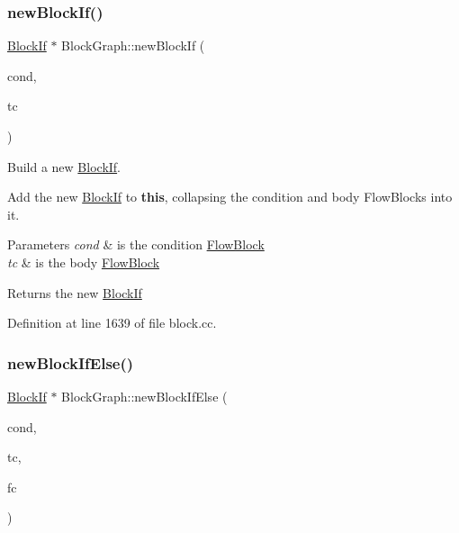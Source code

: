 \subsubsection{\texorpdfstring{newBlockIf()}{newBlockIf()}}
{\footnotesize\ttfamily \mbox{\hyperlink{class_block_if}{Block\+If}} $\ast$ Block\+Graph\+::new\+Block\+If (\begin{DoxyParamCaption}\item[{\mbox{\hyperlink{class_flow_block}{Flow\+Block}} $\ast$}]{cond,  }\item[{\mbox{\hyperlink{class_flow_block}{Flow\+Block}} $\ast$}]{tc }\end{DoxyParamCaption})}



Build a new \mbox{\hyperlink{class_block_if}{Block\+If}}. 

Add the new \mbox{\hyperlink{class_block_if}{Block\+If}} to {\bfseries{this}}, collapsing the condition and body Flow\+Blocks into it. 
\begin{DoxyParams}{Parameters}
{\em cond} & is the condition \mbox{\hyperlink{class_flow_block}{Flow\+Block}} \\
\hline
{\em tc} & is the body \mbox{\hyperlink{class_flow_block}{Flow\+Block}} \\
\hline
\end{DoxyParams}
\begin{DoxyReturn}{Returns}
the new \mbox{\hyperlink{class_block_if}{Block\+If}} 
\end{DoxyReturn}


Definition at line 1639 of file block.\+cc.

\mbox{\label{class_block_graph_acea0ea1a425020062f5d6e3b87a69fe0}} 
\subsubsection{\texorpdfstring{newBlockIfElse()}{newBlockIfElse()}}
{\footnotesize\ttfamily \mbox{\hyperlink{class_block_if}{Block\+If}} $\ast$ Block\+Graph\+::new\+Block\+If\+Else (\begin{DoxyParamCaption}\item[{\mbox{\hyperlink{class_flow_block}{Flow\+Block}} $\ast$}]{cond,  }\item[{\mbox{\hyperlink{class_flow_block}{Flow\+Block}} $\ast$}]{tc,  }\item[{\mbox{\hyperlink{class_flow_block}{Flow\+Block}} $\ast$}]{fc }\end{DoxyParamCaption})}



